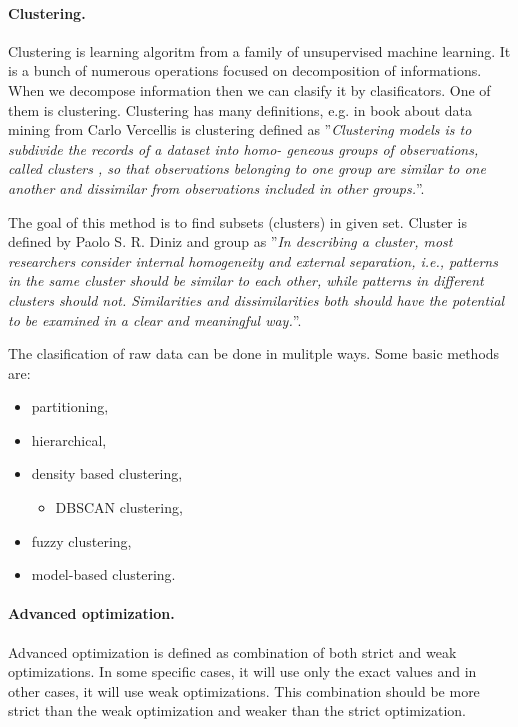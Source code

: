 	\paragraph{Clustering.}
	Clustering is learning algoritm from a family of unsupervised machine
	learning. It is a bunch of numerous operations focused on decomposition of
	informations. When we decompose information then we can clasify it by
	clasificators. One of them is clustering. Clustering has many definitions,
	e.g. in book about data mining from Carlo Vercellis
	\cite{doi:10.1002/9780470753866.ch12} is clustering defined as
	''\emph{Clustering models is to subdivide the records of a dataset into homo-
	geneous groups of observations, called clusters , so that observations
	belonging to one group are similar to one another and dissimilar from
	observations included in other groups.}''.


	The goal of this method is to find subsets (clusters) in given set. Cluster is
	defined by Paolo S. R. Diniz and group \cite{Lam20141115} as ''\emph{In
	describing a cluster, most researchers consider internal homogeneity and
	external separation, i.e., patterns in the same cluster should be similar to
	each other, while patterns in different clusters should not. Similarities and
	dissimilarities both should have the potential to be examined in a clear and
	meaningful way.}''.

	The clasification of raw data can be done in mulitple ways.
	Some basic methods are:
	\begin{itemize}
		\item partitioning,
		\item hierarchical,
		\item density based clustering,
		\begin{itemize}
			\item DBSCAN clustering,
		\end{itemize}
		\item fuzzy clustering,
		\item model-based clustering.
	\end{itemize}

	\paragraph{Advanced optimization.}
	Advanced optimization is defined as combination of both strict and weak
	optimizations. In some specific cases, it will use only the exact values and in
	other cases, it will use weak optimizations. This combination should be more
	strict than the weak optimization and weaker than the strict optimization.

